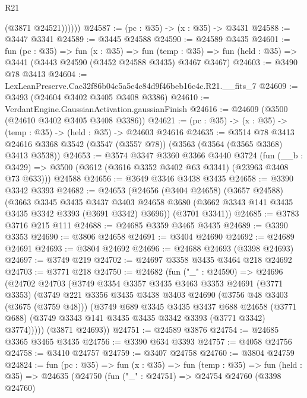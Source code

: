 \begin{lexlean}{R21}
\begin{coremodule}
              (@3871 @24521))))))
@24587 := (pc : @35) -> (x : @35) -> @3431
@24588 := @3447 @3341
@24589 := @3445 @24588
@24590 := @24589 @3435
@24601 := fun (pc : @35) =>
  fun (x : @35) =>
  fun (temp : @35) => fun (held : @35) => @3441 (@3443 @24590 (@3452 @24588 @3435) @3467 @3467)
@24603 := @3490 @78 @3413
@24604 := LexLeanPreserve.Cac32f86b04c5a5e4c84d9f46beb16e4c.R21.__fits_7
@24609 := @3493 (@24604 @3402 @3405 @3408 @3386)
@24610 := VerdantEngine.GaussianActivation.gaussianFinish
@24616 := @24609 (@3500 (@24610 @3402 @3405 @3408 @3386))
@24621 := (pc : @35) -> (x : @35) -> (temp : @35) -> (held : @35) -> @24603 @24616
@24635 := @3514
    @78
    @3413
    @24616
    @3368
    @3542
    (@3547 (@3557 @78))
    (@3563 (@3564 (@3565 @3368) @3413 @3538))
@24653 := @3574
    @3347
    @3360
    @3366
    @3440
    @3724
    (fun (__b : @3429) => @3500 (@3612 (@3616 @3352 @3402 @63 @3341) (@23963 @3408 @73 @633)))
    @24588
@24656 := @3649 @3346 @3438 @3435
@24658 := @3390 @3342 @3393
@24682 := @24653
    (@24656
      (@3404 @24658)
      (@3657 @24588)
      (@3663
        @3345
        @3435
        @3437
        @3403
        @24658
        @3680
        (@3662 @3343 @141 @3435 @3435 @3342 @3393 (@3691 @3342) @3696))
      (@3701 @3341))
@24685 := @3783 @3716 @215 @111
@24688 := @24685 @3359 @3465 @3435
@24689 := @3390 @3353
@24690 := @3806 @24658
@24691 := @3404 @24690
@24692 := @24689 @24691
@24693 := @3804 @24692
@24696 := @24688 @24693 (@3398 @24693)
@24697 := @3749 @219
@24702 := @24697 @3358 @3435 @3464 @218 @24692
@24703 := @3771 @218
@24750 := @24682
    (fun ("_" : @24590) =>
    @24696
      (@24702
        @24703
        (@3749
          @3354
          @3357
          @3435
          @3463
          @3353
          @24691
          (@3771 @3353)
          (@3749
            @221
            @3356
            @3435
            @3438
            @3403
            @24690
            (@3756 @48 @3403 (@3675 (@3759 @48)))
            (@3749
              @689
              @3345
              @3435
              @3437
              @688
              @24658
              (@3771 @688)
              (@3749 @3343 @141 @3435 @3435 @3342 @3393 (@3771 @3342) @3774)))))
      (@3871 @24693))
@24751 := @24589 @3876
@24754 := @24685 @3365 @3465 @3435
@24756 := @3390 @634 @3393
@24757 := @4058 @24756
@24758 := @3410 @24757
@24759 := @3407 @24758
@24760 := @3804 @24759
@24824 := fun (pc : @35) =>
  fun (x : @35) =>
  fun (temp : @35) =>
  fun (held : @35) =>
  @24635
    (@24750
      (fun ("_" : @24751) =>
      @24754
        @24760
        (@3398 @24760)

\end{coremodule}
\end{lexlean}
